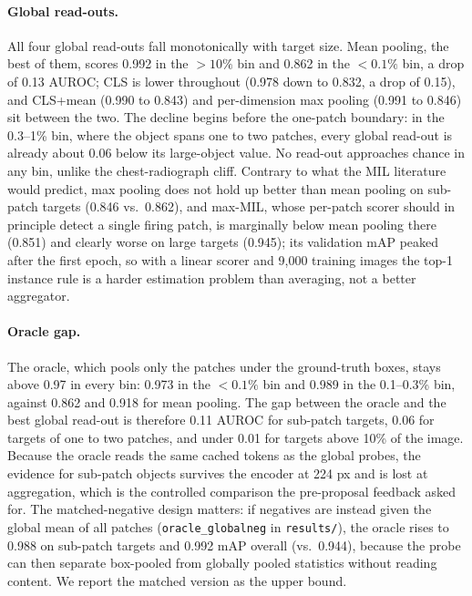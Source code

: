 \documentclass[10pt,letterpaper,twocolumn]{article}
\begin{document}
\paragraph{Global read-outs.}
All four global read-outs fall monotonically with target size. Mean pooling, the best of them,
scores 0.992 in the $>10\%$ bin and 0.862 in the $<0.1\%$ bin, a drop of 0.13 AUROC; CLS is
lower throughout (0.978 down to 0.832, a drop of 0.15), and CLS+mean (0.990 to 0.843) and
per-dimension max pooling (0.991 to 0.846) sit between the two. The decline begins before the
one-patch boundary: in the 0.3--1\% bin, where the object spans one to two patches, every
global read-out is already about 0.06 below its large-object value. No read-out approaches
chance in any bin, unlike the chest-radiograph cliff. Contrary to what the MIL literature
would predict, max pooling does not hold up better than mean pooling on sub-patch targets
(0.846 vs.\ 0.862), and max-MIL, whose per-patch scorer should in principle detect a single
firing patch, is marginally below mean pooling there (0.851) and clearly worse on large
targets (0.945); its validation mAP peaked after the first epoch, so with a linear scorer and
9,000 training images the top-1 instance rule is a harder estimation problem than averaging,
not a better aggregator.

\paragraph{Oracle gap.}
The oracle, which pools only the patches under the ground-truth boxes, stays above 0.97 in
every bin: 0.973 in the $<0.1\%$ bin and 0.989 in the 0.1--0.3\% bin, against 0.862 and 0.918
for mean pooling. The gap between the oracle and the best global read-out is therefore
0.11 AUROC for sub-patch targets, 0.06 for targets of one to two patches, and under 0.01 for
targets above 10\% of the image. Because the oracle reads the same cached tokens as the global
probes, the evidence for sub-patch objects survives the encoder at 224 px and is lost at
aggregation, which is the controlled comparison the pre-proposal feedback asked for. The
matched-negative design matters: if negatives are instead given the global mean of all
patches (\texttt{oracle\_globalneg} in \texttt{results/}), the oracle rises to 0.988 on
sub-patch targets and 0.992 mAP overall (vs.\ 0.944), because the probe can then separate
box-pooled from globally pooled statistics without reading content. We report the matched
version as the upper bound.
\end{document}
